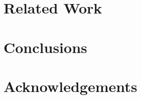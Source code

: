 \documentclass[10pt,sigconf]{acmart}
\begin{document}





\section{Related Work}


%
% 



\section{Conclusions}



\section{Acknowledgements}
\end{document}
